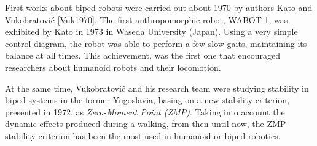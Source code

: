 
First works about biped robots were carried out about 1970 by authors Kato \cite{Kaj2005} and Vukobratović \ref{Vuk1970}. The first anthropomorphic robot, WABOT-1, was exhibited by Kato in 1973 in Waseda University (Japan). Using a very simple control diagram, the robot was able to perform a few slow gaits, maintaining its balance at all times. This achievement, was the first one that encouraged researchers about humanoid robots and their locomotion.


At the same time, Vukobratović and his research team were studying stability in biped systems in the former Yugoslavia, basing on a new stability criterion, presented in 1972, as \textit{Zero-Moment Point (ZMP)}. Taking into account the dynamic effects produced during a walking, from then until now, the ZMP stability criterion has been the most used in humanoid or biped robotics.

